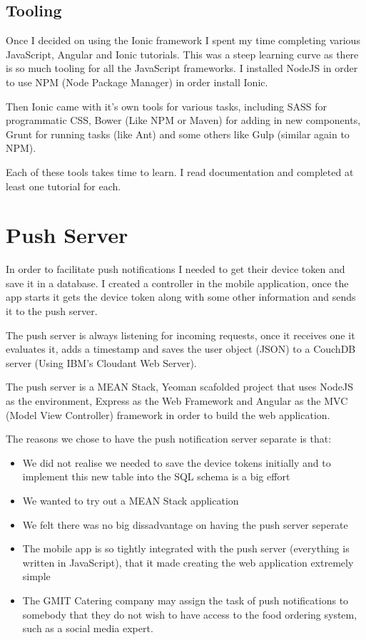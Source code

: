 \subsection{Tooling}
Once I decided on using the Ionic framework I spent my time completing various JavaScript, Angular and Ionic tutorials. This was a steep learning curve as there is so much tooling for all the JavaScript frameworks.
I installed NodeJS in order to use NPM (Node Package Manager) in order install Ionic. 

Then Ionic came with it's own tools for various tasks, including SASS for programmatic CSS, Bower (Like NPM or Maven) for adding in new components, Grunt for running tasks (like Ant) and some others like Gulp (similar again to NPM).

Each of these tools takes time to learn. I read documentation and completed at least one tutorial for each.

\section{Push Server}
In order to facilitate push notifications I needed to get their device token and save it in a database.
I created a controller in the mobile application, once the app starts it gets the device token along with some other information and sends it to the push server.

The push server is always listening for incoming requests, once it receives one it evaluates it, adds a timestamp and saves the user object (JSON) to a CouchDB server (Using IBM's Cloudant Web Server).

The push server is a MEAN Stack, Yeoman scafolded project that uses NodeJS as the environment, Express as the Web Framework and Angular as the MVC (Model View Controller) framework in order to build the web application.
\linebreak

The reasons we chose to have the push notification server separate is that:
\begin{itemize}
\item We did not realise we needed to save the device tokens initially and to implement this new table into the SQL schema is a big effort
\item We wanted to try out a MEAN Stack application
\item We felt there was no big dissadvantage on having the push server seperate
\item The mobile app is so tightly integrated with the push server (everything is written in JavaScript), that it made creating the web application extremely simple
\item The GMIT Catering company may assign the task of push notifications to somebody that they do not wish to have access to the food ordering system, such as a social media expert. 
\end{itemize}

